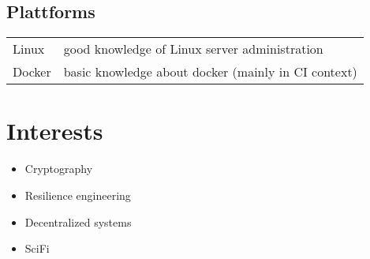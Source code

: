 \documentclass{gnet_cv}
\begin{document}
\subsection{Plattforms}
\begin{tabularx}{\textwidth}{L{mylhead} l}
    Linux & good knowledge of Linux server administration\\
    Docker & basic knowledge about docker (mainly in CI context)\\
    
\end{tabularx}

\section{Interests}
\begin{itemize}
    \item Cryptography
    \item Resilience engineering
    \item Decentralized systems
    \item SciFi
\end{itemize}
\end{document}
